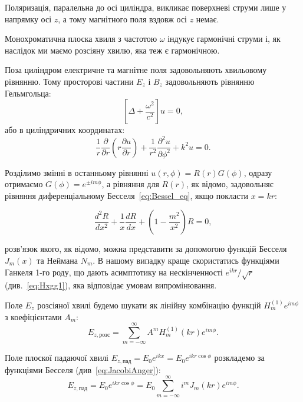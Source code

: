 \begin{problem}
\begin{solution}
	Поляризація, паралельна до осі циліндра, викликає поверхневі струми лише у напрямку осі $z$, а тому магнітного поля вздовж осі $z$ немає.
%

	Монохроматична плоска хвиля з частотою $\omega$ індукує  гармонічні струми і, як наслідок ми маємо розсіяну хвилю, яка теж є гармонічною.

	Поза циліндром електричне та магнітне поля задовольняють хвильовому рівнянню.
	Тому просторові частини $E_z$ і $B_z$ задовольняють рівнянню Гельмгольца:
	\[
		\left[ \Delta + \frac{\omega^2}{c^2}\right] u = 0,
	\]
	або в циліндричних координатах:
	\[
		\frac1r \frac{\partial }{\partial r}
		\left( r \frac{\partial u}{\partial r} \right) + \frac{1}{r^2} \frac{\partial^2 u}{\partial \phi^2} + k^2 u = 0.
	\]

	Розділимо змінні в останньому рівнянні $u(r,\phi) = R(r)G(\phi)$, одразу отримаємо $G(\phi) = e^{\pm im\phi}$, а рівняння для $R(r)$, як відомо, задовольняє рівняння диференціальному Бесселя~\eqref{eq:Bessel_eq}, якщо покласти $x = kr$:

\begin{equation}\label{eq:BessProblem}\tag{*}
		\frac{d^2R}{dx^2} + \frac1x\frac{dR}{dx} + \left(1 - \frac{m^2}{x^2} \right) R = 0,
\end{equation}

	розв'язок якого, як відомо, можна представити за допомогою функцій Бесселя $J_m(x)$ та Неймана $N_m$.
    В нашому випадку краще скористатись функціями Ганкеля 1-го роду, що дають асимптотику на нескінченності $e^{ikr}/\sqrt{r}$ (див.~\eqref{eq:Hxgg1}), яка відповідає умовам випромінювання.

    Поле  $E_z$ розсіяної хвилі будемо шукати як  лінійну комбінацію функцій $H_m^{(1)}e^{im\phi}$ з коефіцієнтами $A_m$:
	\[
		E_{z,\text{розс}} =  \sum\limits_{m = -\infty}^{\infty} A^m H^{(1)}_m(k r)e^{im\phi}.
	\]

	Поле плоскої падаючої хвилі $ E_{z,\text{пад}} = E_0e^{ikx} = E_0e^{ikr\cos\phi}$ розкладемо за функціями Бесселя (див~\eqref{eq:JacobiAnger}):
	\[
		E_{z,\text{пад}} =  E_0e^{ikr\cos\phi} =  E_0 \sum\limits_{m = -\infty}^{\infty} i^m J_m(k r)e^{im\phi}.
	\]


\end{solution}
\end{problem}
